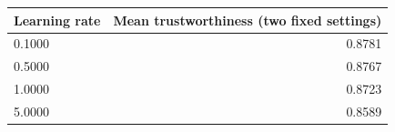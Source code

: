 \begin{tabular}{lr}
\toprule
Learning rate & Mean trustworthiness (two fixed settings) \\
\midrule
0.1000 & 0.8781 \\
0.5000 & 0.8767 \\
1.0000 & 0.8723 \\
5.0000 & 0.8589 \\
\bottomrule
\end{tabular}
